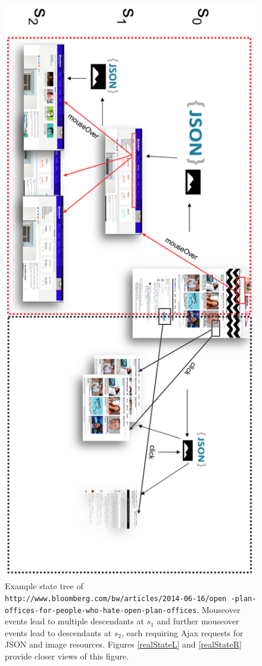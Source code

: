 \documentclass{sig-alternate}
\begin{document}
\begin{figure}
\centering
\includegraphics[height=0.98\textheight]{./imgs/realStates4H.png}
\caption{Example state tree of \texttt{http://www.bloomberg.com/bw/articles/2014-06-16/open -plan-offices-for-people-who-hate-open-plan-offices}. Mouseover events lead to multiple descendants at $s_1$ and further mouseover events lead to descendants at $s_2$, each requiring Ajax requests for JSON and image resources. Figures \ref{realStateL} and \ref{realStateR} provide closer views of this figure.}
\label{realState}
\end{figure}
\end{document}
